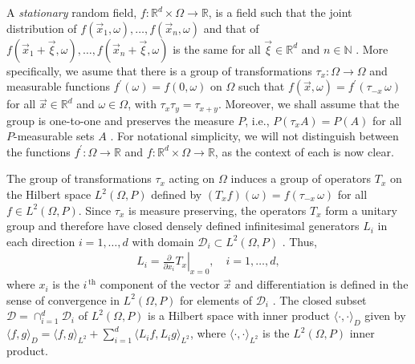 \documentclass{cmslatex}
\begin{document}
A \emph{stationary} random field, $f:\mathbb{R}^d\times\Omega\to\mathbb{R}$, is a
field such that the  
joint distribution of $f(\vec{x}_1,\omega),\ldots,f(\vec{x}_n,\omega)$ and that of
$f(\vec{x}_1+\vec{\xi},\omega),\ldots,f(\vec{x}_n+\vec{\xi},\omega)$ is the same for all
$\vec{\xi}\in\mathbb{R}^d$ and $n\in\mathbb{N}$
\cite{Golden:CMP-473,Papanicolaou:RF-835}.
More specifically, we asume that there is a group of transformations
$\tau_x:\Omega\to\Omega$ and measurable functions $f^{\prime}(\omega)=f(0,\omega)$ on $\Omega$ such that
$f(\vec{x},\omega)=f^\prime(\tau_{-x}\,\omega)$ for all $\vec{x}\in\mathbb{R}^d$ and
$\omega\in\Omega$, with $\tau_x\tau_y=\tau_{x+y}$.  Moreover, we shall assume that the
group is one-to-one and preserves the measure $P$, i.e., $P(\tau_xA)=P(A)$
for all $P$-measurable sets $A$
\cite{Golden:CMP-473,Papanicolaou:RF-835}. For notational simplicity,
we will not distinguish between the functions $f^\prime:\Omega\to\mathbb{R}$ and
$f:\mathbb{R}^d\times\Omega\to\mathbb{R}$, as the context of each is now
clear. 






The group of transformations $\tau_x$ acting on $\Omega$ induces a group of
operators $T_x$ on the Hilbert space $L^2(\Omega,P)$ defined by
$(T_xf)(\omega)=f(\tau_{-x}\,\omega)$ for all $f\in L^2(\Omega,P)$. Since $\tau_x$ is measure
preserving, the operators $T_x$ form a unitary group and therefore
have closed densely defined infinitesimal generators $L_i$ in each
direction $i=1,\ldots,d$ with domain $\mathscr{D}_i\subset L^2(\Omega,P)$
\cite{Golden:CMP-473,Papanicolaou:RF-835}. Thus,  
%
\begin{align}\label{eq:Li}
  L_i=\left.\frac{\partial}{\partial x_i}T_x \right|_{x=0}, \quad i=1,\ldots,d,
\end{align}
%
where $x_i$
is the $i^{\,\text{th}}$ component of the vector
$\vec{x}$ and differentiation is defined in the sense of convergence
in $L^2(\Omega,P)$ for elements of $\mathscr{D}_i$
\cite{Golden:CMP-473}. The closed subset
$\mathscr{D}=\cap_{i=1}^d\mathscr{D}_i$ of $L^2(\Omega,P)$ is a Hilbert space
\cite{Golden:CMP-473} with inner product $\langle \cdot,\cdot\rangle_D$ given by
$\langle f,g\rangle_D=\langle f,g\rangle_{L^2}+\sum_{i=1}^d\langle L_if,L_ig\rangle_{L^2}$, where
$\langle\cdot,\cdot\rangle_{L^2}$ is the $L^2(\Omega,P)$ inner product. 
\end{document}
